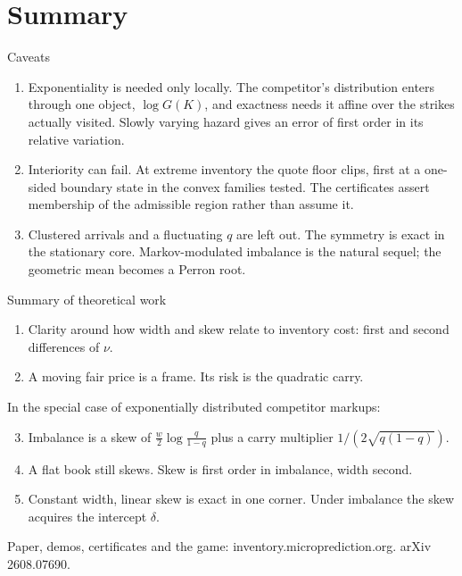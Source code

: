\documentclass[10pt]{beamer}
\newcommand{\blue}[1]{\textcolor{pcblue}{#1}}
\newcommand{\band}[1]{%
  \begin{frame}[plain]\vspace{2.2cm}
  \noindent\makebox[\textwidth][c]{\colorbox{pcgreen}{\parbox[t][3.2cm][t]{\dimexpr\paperwidth-2\fboxsep}{\vspace{0.5cm}\raggedleft\color{white}#1\hspace{0.5cm}}}}
  \end{frame}}
\begin{document}
\section{Summary}

\begin{frame}{Caveats}
\begin{enumerate}
\item Exponentiality is needed only locally. The competitor's distribution enters through one object, $\log G(K)$, and exactness needs it affine over the strikes actually visited. Slowly varying hazard gives an error of first order in its relative variation.
\item Interiority can fail. At extreme inventory the quote floor clips, first at a one-sided boundary state in the convex families tested. The certificates assert membership of the admissible region rather than assume it.
\item Clustered arrivals and a fluctuating $q$ are left out. The symmetry is exact in the stationary core. Markov-modulated imbalance is the natural sequel; the geometric mean becomes a Perron root.
\end{enumerate}
\end{frame}

\begin{frame}{Summary of theoretical work}
\begin{enumerate}
\item Clarity around how \blue{width} and \blue{skew} relate to inventory cost: first and second differences of $\nu$.
\item A moving fair price is a frame. Its risk is the quadratic carry.
\end{enumerate}
In the special case of exponentially distributed competitor markups:
\begin{enumerate}\setcounter{enumi}{2}
\item Imbalance is a skew of $\tfrac{w}{2}\log\tfrac{q}{1-q}$ plus a carry multiplier $1/(2\sqrt{q(1-q)})$.
\item A flat book still skews. Skew is first order in imbalance, width second.
\item Constant width, linear skew is exact in one corner. Under imbalance the skew acquires the intercept $\delta$.
\end{enumerate}
\vspace{1em}
Paper, demos, certificates and the game: inventory.microprediction.org. arXiv 2608.07690.
\end{frame}

\band{{\Large\bfseries Questions?}}
\end{document}
